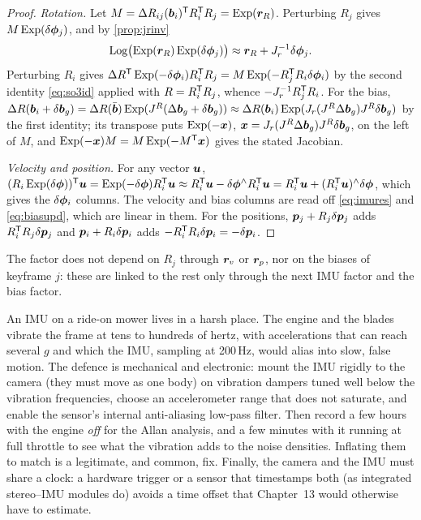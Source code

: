 \begin{proof}
\emph{Rotation.} Let $M=\Delta R_{ij}(\bm{b}_i)^{\mathsf{T}} R_i^{\mathsf{T}} R_j=
\operatorname{Exp}(\bm{r}_R)$. Perturbing $R_j$ gives $M\operatorname{Exp}(\delta\bm{\phi}_j)$, and
by \cref{prop:jrinv}
\[
\operatorname{Log}\bigl(\operatorname{Exp}(\bm{r}_R)\operatorname{Exp}(\delta\bm{\phi}_j)\bigr)\approx
\bm{r}_R+J_r^{-1}\delta\bm{\phi}_j .
\] Perturbing $R_i$ gives
$\Delta R^{\mathsf{T}}\operatorname{Exp}(-\delta\bm{\phi}_i)R_i^{\mathsf{T}} R_j=M\operatorname{Exp}(-R_j^{\mathsf{T}} R_i\delta\bm{\phi}_i)$ by
the second identity \eqref{eq:so3id} applied with $R=R_i^{\mathsf{T}} R_j$,
whence $-J_r^{-1}R_j^{\mathsf{T}} R_i$. For the bias,
$\Delta R(\bm{b}_i+\delta\bm{b}_g)=\Delta R(\bar{\bm{b}})
\operatorname{Exp}(J^R(\Delta\bm{b}_g+\delta\bm{b}_g))\approx\Delta R(\bm{b}_i)
\operatorname{Exp}(J_r(J^R\Delta\bm{b}_g)J^R\delta\bm{b}_g)$ by the first identity;
its transpose puts $\operatorname{Exp}(-\bm{x})$, $\bm{x}=J_r(J^R\Delta\bm{b}_g)
J^R\delta\bm{b}_g$, on the left of $M$, and $\operatorname{Exp}(-\bm{x})M=
M\operatorname{Exp}(-M^{\mathsf{T}}\bm{x})$ gives the stated Jacobian.

\emph{Velocity and position.} For any vector $\bm{u}$,
$(R_i\operatorname{Exp}(\delta\bm{\phi}))^{\mathsf{T}}\bm{u}=\operatorname{Exp}(-\delta\bm{\phi})R_i^{\mathsf{T}}\bm{u}\approx
R_i^{\mathsf{T}}\bm{u}-\delta\bm{\phi}^{\wedge}R_i^{\mathsf{T}}\bm{u}=R_i^{\mathsf{T}}\bm{u}+(R_i^{\mathsf{T}}
\bm{u})^{\wedge}\delta\bm{\phi}$, which gives the $\delta\bm{\phi}_i$ columns. The
velocity and bias columns are read off \eqref{eq:imures} and
\eqref{eq:biasupd}, which are linear in them. For the positions,
$\bm{p}_j+R_j\delta\bm{p}_j$ adds $R_i^{\mathsf{T}} R_j\delta\bm{p}_j$ and $\bm{p}_i+R_i\delta\bm{p}_i$
adds $-R_i^{\mathsf{T}} R_i\delta\bm{p}_i=-\delta\bm{p}_i$.
\end{proof}

The factor does not depend on $R_j$ through $\bm{r}_v$ or $\bm{r}_p$,
nor on the biases of keyframe $j$: these are linked to the rest only
through the next IMU factor and the bias factor.

\begin{mower}
An IMU on a ride-on mower lives in a harsh place. The engine and the
blades vibrate the frame at tens to hundreds of hertz, with
accelerations that can reach several $g$ and which the IMU, sampling at
200\,Hz, would alias into slow, false motion. The defence is mechanical
and electronic: mount the IMU rigidly to the camera (they must move as
one body) on vibration dampers tuned well below the vibration
frequencies, choose an accelerometer range that does not saturate, and
enable the sensor's internal anti-aliasing low-pass filter. Then record
a few hours with the engine \emph{off} for the Allan analysis, and a
few minutes with it running at full throttle to see what the vibration
adds to the noise densities. Inflating them to match is a legitimate,
and common, fix. Finally, the camera and the IMU must share a clock:
a hardware trigger or a sensor that timestamps both (as integrated
stereo--IMU modules do) avoids a time offset that Chapter~13 would
otherwise have to estimate.
\end{mower}

